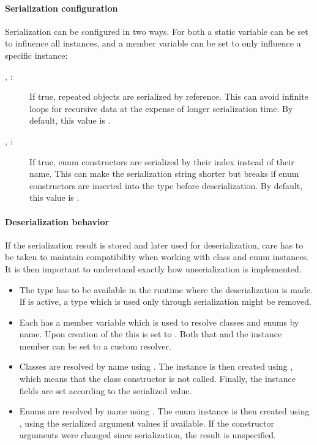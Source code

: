 \paragraph{Serialization configuration}

Serialization can be configured in two ways. For both a static variable can be set to influence all  instances, and a member variable can be set to only influence a specific instance:

\begin{description}
	\item[, :] If true, repeated objects are serialized by reference. This can avoid infinite loops for recursive data at the expense of longer serialization time. By default, this value is .
	\item[, :] If true, enum constructors are serialized by their index instead of their name. This can make the serialization string shorter but breaks if enum constructors are inserted into the type before deserialization. By default, this value is .
\end{description}

\paragraph{Deserialization behavior}

If the serialization result is stored and later used for deserialization, care has to be taken to maintain compatibility when working with class and enum instances. It is then important to understand exactly how unserialization is implemented.

\begin{itemize}
	\item The type has to be available in the runtime where the deserialization is made. If  is active, a type which is used only through serialization might be removed.
	\item Each  has a member variable  which is used to resolve classes and enums by name. Upon creation of the  this is set to . Both that and the instance member can be set to a custom resolver.
	\item Classes are resolved by name using . The instance is then created using , which means that the class constructor is not called. Finally, the instance fields are set according to the serialized value.
	\item Enums are resolved by name using . The enum instance is then created using , using the serialized argument values if available. If the constructor arguments were changed since serialization, the result is unspecified.
\end{itemize}

